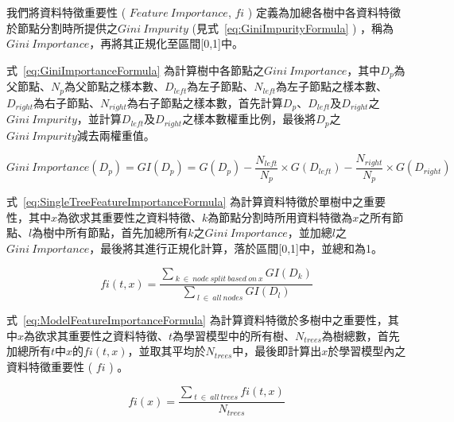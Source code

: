 我們將資料特徵重要性 ( $Feature\ Importance$, $fi$ ) 定義為加總各樹中各資料特徵於節點分割時所提供之$Gini\ Impurity$ (見式~\ref{eq:GiniImpurityFormula} ) ，稱為$Gini\ Importance$，再將其正規化至區間[0,1]中。

式~\ref{eq:GiniImportanceFormula} 為計算樹中各節點之$Gini\ Importance$，其中$D_p$為父節點、$N_p$為父節點之樣本數、$D_{left}$為左子節點、$N_{left}$為左子節點之樣本數、$D_{right}$為右子節點、$N_{right}$為右子節點之樣本數，首先計算$D_p$、$D_{left}$及$D_{right}$之$Gini\ Impurity$，並計算$D_{left}$及$D_{right}$之樣本數權重比例，最後將$D_p$之$Gini\ Impurity$減去兩權重值。

\begin{equation}
  \label{eq:GiniImportanceFormula}
  Gini\ Importance(D_p) = GI(D_p) = G(D_p) - \frac{N_{left}}{N_p} \times G(D_{left}) - \frac{N_{right}}{N_p} \times G(D_{right})
\end{equation}

式~\ref{eq:SingleTreeFeatureImportanceFormula} 為計算資料特徵於單樹中之重要性，其中$x$為欲求其重要性之資料特徵、$k$為節點分割時所用資料特徵為$x$之所有節點、$l$為樹中所有節點，首先加總所有$k$之$Gini\ Importance$，並加總$l$之$Gini\ Importance$，最後將其進行正規化計算，落於區間[0,1]中，並總和為1。

\begin{equation}
  \label{eq:SingleTreeFeatureImportanceFormula}
  fi(t,x) = \frac{\sum_{\ k\ \in\ node\ split\ based\ on\ x}GI(D_k)}{\sum_{\ l\ \in\ all\ nodes}GI(D_l)}
\end{equation}
\newpage

式~\ref{eq:ModelFeatureImportanceFormula} 為計算資料特徵於多樹中之重要性，其中$x$為欲求其重要性之資料特徵、$t$為學習模型中的所有樹、$N_{trees}$為樹總數，首先加總所有$t$中$x$的$fi(t,x)$，並取其平均於$N_{trees}$中，最後即計算出$x$於學習模型內之資料特徵重要性 ( $fi$ ) 。

\begin{equation}
  \label{eq:ModelFeatureImportanceFormula}
  fi(x) = \frac{\sum_{\ t\ \in\ all\ trees}fi(t,x)}{N_{trees}}
\end{equation}
\newpage